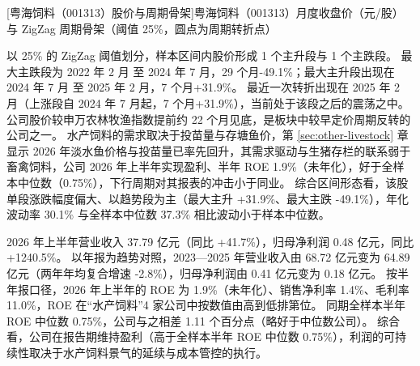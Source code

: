 \begin{center}
\begin{minipage}{\textwidth}\centering
{}

[粤海饲料（001313）股价与周期骨架]{粤海饲料（001313）月度收盘价（元/股）与 ZigZag 周期骨架（阈值 25\%，圆点为周期转折点）}
\end{minipage}
\end{center}

 以 25\% 的 ZigZag 阈值划分，样本区间内股价形成 1 个主升段与 1 个主跌段。 最大主跌段为 2022 年 2 月 至 2024 年 7 月，29 个月-49.1\%；最大主升段出现在 2024 年 7 月 至 2025 年 2 月，7 个月+31.9\%。 最近一次转折出现在 2025 年 2 月（上涨段自 2024 年 7 月起，7 个月+31.9\%），当前处于该段之后的震荡之中。 公司股价较申万农林牧渔指数提前约 22 个月见底，是板块中较早定价周期反转的公司之一。 水产饲料的需求取决于投苗量与存塘鱼价，第 \ref{sec:other-livestock} 章显示 2026 年淡水鱼价格与投苗量已率先回升，其需求驱动与生猪存栏的联系弱于畜禽饲料，公司 2026 年上半年实现盈利、半年 ROE 1.9\%（未年化），好于全样本中位数（0.75\%），下行周期对其报表的冲击小于同业。 综合区间形态看，该股单段涨跌幅度偏大、以趋势段为主（最大主升 +31.9\%、最大主跌 -49.1\%），年化波动率 30.1\% 与全样本中位数 37.3\% 相比波动小于样本中位数。

 2026 年上半年营业收入 37.79 亿元（同比 +41.7\%），归母净利润 0.48 亿元，同比 +1240.5\%。 以年报为趋势对照，2023---2025 年营业收入由 68.72 亿元变为 64.89 亿元（两年年均复合增速 -2.8\%），归母净利润由 0.41 亿元变为 0.18 亿元。 按半年报口径，2026 年上半年的 ROE 为 1.9\%（未年化）、销售净利率 1.4\%、毛利率 11.0\%，ROE 在“水产饲料”4 家公司中按数值由高到低排第位。 同期全样本半年 ROE 中位数 0.75\%，公司与之相差 1.11 个百分点（略好于中位数公司）。 综合看，公司在报告期维持盈利（高于全样本半年 ROE 中位数 0.75\%），利润的可持续性取决于水产饲料景气的延续与成本管控的执行。

